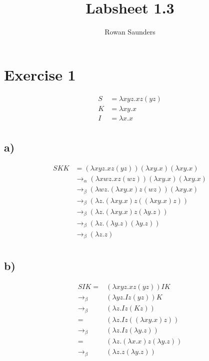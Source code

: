 \documentclass[11pt]{article}
\title{Labsheet 1.3}
\author{Rowan Saunders}
\begin{document}
\maketitle

\section{Exercise 1}

\begin{align*}
  S &= \lambda xyz.xz(yz)\\
  K &= \lambda xy.x\\
  I &= \lambda x.x\\
\end{align*}

\subsection{a)}

\begin{align*}
  SKK &= (\lambda xyz.xz(yz))(\lambda xy.x)(\lambda xy.x)\\
  &\to_\alpha (\lambda xwz.xz(wz))(\lambda xy.x)(\lambda xy.x)\\
  &\to_\beta (\lambda wz.(\lambda xy.x)z(wz))(\lambda xy.x)\\
  &\to_\beta (\lambda z.(\lambda xy.x)z((\lambda xy.x)z))\\
  &\to_\beta (\lambda z.(\lambda xy.x)z(\lambda y.z))\\
  &\to_\beta (\lambda z.(\lambda y.z)(\lambda y.z))\\
  &\to_\beta (\lambda z.z)\\
\end{align*}

\subsection{b)}

\begin{align*}
  SIK =& (\lambda xyz.xz(yz))IK\\
  \to_\beta& (\lambda yz.Iz(yz))K\\
  \to_\beta& (\lambda z.Iz(Kz))\\
  =& (\lambda z.Iz((\lambda xy.x)z))\\
  \to_\beta& (\lambda z.Iz(\lambda y.z))\\
  =& (\lambda z.(\lambda x.x)z(\lambda y.z))\\
  \to_\beta& (\lambda z.z(\lambda y.z))\\
\end{align*}
\end{document}
